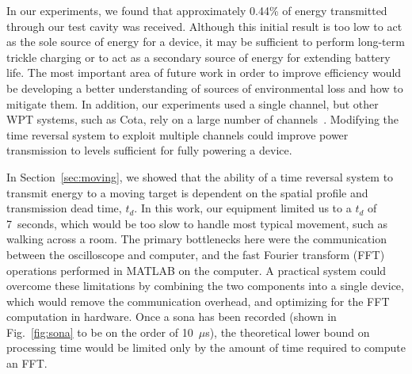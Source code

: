 In our experiments, we found that approximately 0.44\% of energy transmitted
through our test cavity was received.
%
Although this initial result is too low to act as the sole source of energy for
a device, it may be sufficient to perform long-term trickle charging or to act
as a secondary source of energy for extending battery life.
%
The most important area of future work in order to improve efficiency would be
developing a better understanding of sources of environmental loss and how to
mitigate them.
%
In addition, our experiments used a single channel, but other WPT systems, such
as Cota, rely on a large number of channels~\cite{cota}.
%
Modifying the time reversal system to exploit multiple channels could improve
power transmission to levels sufficient for fully powering a device.



In Section~\ref{sec:moving}, we showed that the ability of a time reversal system
to transmit energy to a moving target is dependent on the spatial profile and
transmission dead time, $t_{d}$.
%
In this work, our equipment limited us to a $t_d$ of 7~seconds, which would be too slow
to handle most typical movement, such as walking across a room.
%
The primary bottlenecks here were the communication between the oscilloscope
and computer, and the fast Fourier transform (FFT) operations performed in MATLAB
on the computer.
%
A practical system could overcome these limitations by combining the two components
into a single device, which would remove the communication overhead, and optimizing for
the FFT computation in hardware.
%
Once a sona has been recorded (shown in Fig.~\ref{fig:sona} to be on the order of 10~$\mu$s),
the theoretical lower bound on processing time would be limited only by the amount of
time required to compute an FFT.

